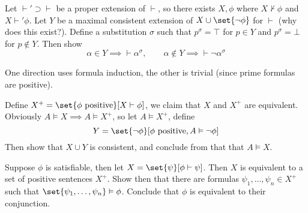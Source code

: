     Let ${\vdash'}\supset{\vdash}$ be a proper extension of $\vdash$, so there exists $X,\phi$
    where $X\nvdash\phi$ and $X\vdash'\phi$.
    Let $Y$ be a maximal consistent extension of $X\cup\set{\neg\phi}$ for $\vdash$ (why does this
    exist?).
    Define a substitution $\sigma$ such that $p^\sigma=\top$ for $p\in Y$ and $p^\sigma=\bot$ for
    $p\notin Y$.
    Then show
    $$ \alpha\in Y\implies\vdash\alpha^\sigma,\qquad
    \alpha\notin Y\implies\vdash\neg\alpha^\sigma $$

\ehint

\bhint

    \benum
        \item One direction uses formula induction, the other is trivial (since prime formulas are
        positive).
        \item Define $X^+=\set{\phi\hbox{ positive}}[X\vdash\phi]$, we claim that $X$ and $X^+$
        are equivalent.
        Obviously $A\vDash X\implies A\vDash X^+$, so let $A\vDash X^+$, define
        $$ Y = \set{\neg\phi}[\phi\hbox{ positive},A\vDash\neg\phi] $$
        Then show that $X\cup Y$ is consistent, and conclude from that that $A\vDash X$.
        \item Suppose $\phi$ is satisfiable, then let $X=\set{\psi}[\phi\vdash\psi]$.
        Then $X$ is equivalent to a set of positive sentences $X^+$.
        Show then that there are formulas $\psi_1,\dots,\psi_n\in X^+$ such that
        $\set{\psi_1,\dots,\psi_n}\vDash\phi$.
        Conclude that $\phi$ is equivalent to their conjunction.
    \eenum

\ehint

\bye

